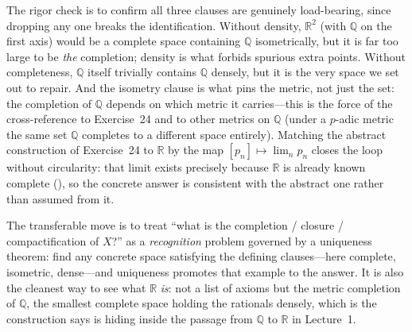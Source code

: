 \documentclass[main.tex]{subfiles}
\begin{document}
\begin{Reflection}
The rigor check is to confirm all three clauses are genuinely load-bearing, since dropping any one
breaks the identification. Without density, $\mathbb R^2$ (with $\mathbb Q$ on the first axis) would be a
complete space containing $\mathbb Q$ isometrically, but it is far too large to be \emph{the} completion;
density is what forbids spurious extra points. Without completeness, $\mathbb Q$ itself trivially
contains $\mathbb Q$ densely, but it is the very space we set out to repair. And the isometry clause is
what pins the metric, not just the set: the completion of $\mathbb Q$ depends on which metric it
carries---this is the force of the cross-reference to Exercise~24 and to other metrics on $\mathbb Q$
(under a $p$-adic metric the same set $\mathbb Q$ completes to a different space entirely). Matching the
abstract construction of Exercise~24 to $\mathbb R$ by the map $[p_n]\mapsto\lim_n p_n$ closes the loop
without circularity: that limit exists precisely because $\mathbb R$ is already known complete
(), so the concrete answer is consistent with the
abstract one rather than assumed from it.

The transferable move is to treat ``what is the completion / closure / compactification of $X$?'' as a
\emph{recognition} problem governed by a uniqueness theorem: find any concrete space satisfying the
defining clauses---here complete, isometric, dense---and uniqueness promotes that example to the answer.
It is also the cleanest way to see what $\mathbb R$ \emph{is}: not a list of axioms but the metric
completion of $\mathbb Q$, the smallest complete space holding the rationals densely, which is the
construction  says is hiding inside the passage from $\mathbb Q$ to $\mathbb R$ in
Lecture~1.
\end{Reflection}


\clearpage
\par{}\par\nobreak\smallskip
\end{document}
